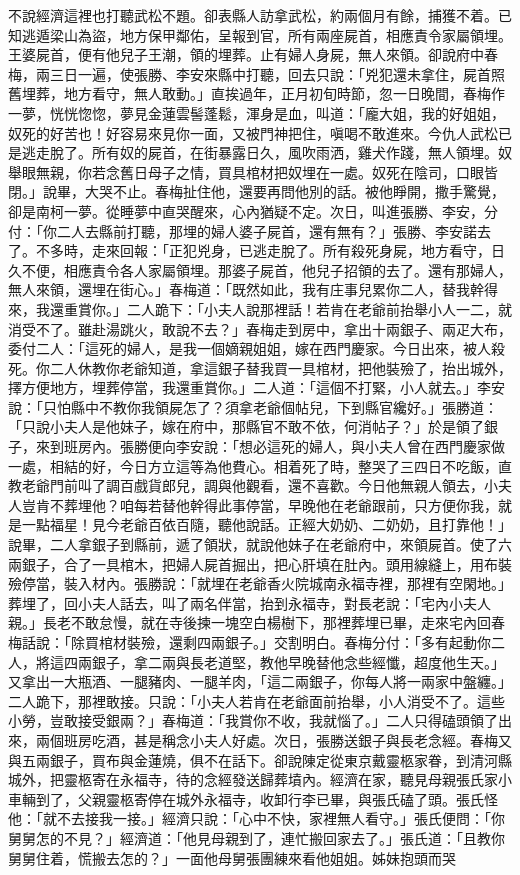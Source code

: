 \begin{showcontents}{}
不說經濟這裡也打聽武松不題。卻表縣人訪拿武松，約兩個月有餘，捕獲不着。已知逃遁梁山為盜，地方保甲鄰佑，呈報到官，所有兩座屍首，相應責令家屬領埋。王婆屍首，便有他兒子王潮，領的埋葬。止有婦人身屍，無人來領。卻說府中春梅，兩三日一遍，使張勝、李安來縣中打聽，回去只說：「兇犯還未拿住，屍首照舊埋葬，地方看守，無人敢動。」直挨過年，正月初旬時節，忽一日晚間，春梅作一夢，恍恍惚惚，夢見金蓮雲髻蓬鬆，渾身是血，叫道：「龐大姐，我的好姐姐，奴死的好苦也！好容易來見你一面，又被門神把住，嗔喝不敢進來。今仇人武松已是逃走脫了。所有奴的屍首，在街暴露日久，風吹雨洒，雞犬作踐，無人領埋。奴舉眼無親，你若念舊日母子之情，買具棺材把奴埋在一處。奴死在陰司，口眼皆閉。」說畢，大哭不止。春梅扯住他，還要再問他別的話。被他睜開，撒手驚覺，卻是南柯一夢。從睡夢中直哭醒來，心內猶疑不定。次日，叫進張勝、李安，分付：「你二人去縣前打聽，那埋的婦人婆子屍首，還有無有？」張勝、李安諾去了。不多時，走來回報：「正犯兇身，已逃走脫了。所有殺死身屍，地方看守，日久不便，相應責令各人家屬領埋。那婆子屍首，他兒子招領的去了。還有那婦人，無人來領，還埋在街心。」春梅道：「既然如此，我有庄事兒累你二人，替我幹得來，我還重賞你。」二人跪下：「小夫人說那裡話！若肯在老爺前抬舉小人一二，就消受不了。雖赴湯跳火，敢說不去？」春梅走到房中，拿出十兩銀子、兩疋大布，委付二人：「這死的婦人，是我一個嫡親姐姐，嫁在西門慶家。今日出來，被人殺死。你二人休教你老爺知道，拿這銀子替我買一具棺材，把他裝殮了，抬出城外，擇方便地方，埋葬停當，我還重賞你。」二人道：「這個不打緊，小人就去。」李安說：「只怕縣中不教你我領屍怎了？須拿老爺個帖兒，下到縣官纔好。」張勝道：「只說小夫人是他妹子，嫁在府中，那縣官不敢不依，何消帖子？」於是領了銀子，來到班房內。張勝便向李安說：「想必這死的婦人，與小夫人曾在西門慶家做一處，相結的好，今日方立這等為他費心。相着死了時，整哭了三四日不吃飯，直教老爺門前叫了調百戲貨郎兒，調與他觀看，還不喜歡。今日他無親人領去，小夫人豈肯不葬埋他？咱每若替他幹得此事停當，早晚他在老爺跟前，只方便你我，就是一點福星！見今老爺百依百隨，聽他說話。正經大奶奶、二奶奶，且打靠他！」說畢，二人拿銀子到縣前，遞了領狀，就說他妹子在老爺府中，來領屍首。使了六兩銀子，合了一具棺木，把婦人屍首掘出，把心肝填在肚內。頭用線縫上，用布裝殮停當，裝入材內。張勝說：「就埋在老爺香火院城南永福寺裡，那裡有空閑地。」葬埋了，回小夫人話去，叫了兩名伴當，抬到永福寺，對長老說：「宅內小夫人親。」長老不敢怠慢，就在寺後揀一塊空白楊樹下，那裡葬埋已畢，走來宅內回春梅話說：「除買棺材裝殮，還剩四兩銀子。」交割明白。春梅分付：「多有起動你二人，將這四兩銀子，拿二兩與長老道堅，教他早晚替他念些經懺，超度他生天。」又拿出一大瓶酒、一腿豬肉、一腿羊肉，「這二兩銀子，你每人將一兩家中盤纏。」二人跪下，那裡敢接。只說：「小夫人若肯在老爺面前抬舉，小人消受不了。這些小勞，豈敢接受銀兩？」春梅道：「我賞你不收，我就惱了。」二人只得磕頭領了出來，兩個班房吃酒，甚是稱念小夫人好處。次日，張勝送銀子與長老念經。春梅又與五兩銀子，買布與金蓮燒，俱不在話下。卻說陳定從東京戴靈柩家眷，到清河縣城外，把靈柩寄在永福寺，待的念經發送歸葬墳內。經濟在家，聽見母親張氏家小車輛到了，父親靈柩寄停在城外永福寺，收卸行李已畢，與張氏磕了頭。張氏怪他：「就不去接我一接。」經濟只說：「心中不快，家裡無人看守。」張氏便問：「你舅舅怎的不見？」經濟道：「他見母親到了，連忙搬回家去了。」張氏道：「且教你舅舅住着，慌搬去怎的？」一面他母舅張團練來看他姐姐。姊妹抱頭而哭
\end{showcontents}
